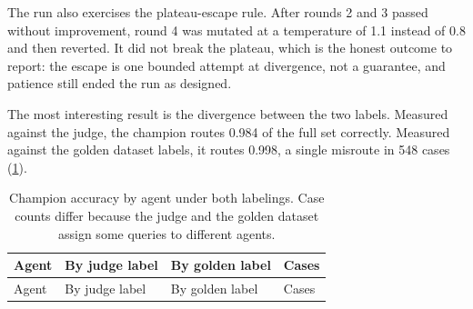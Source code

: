 The run also exercises the plateau-escape rule. After rounds 2 and 3 passed without improvement, round 4 was mutated at a temperature of 1.1 instead of 0.8 and then reverted. It did not break the plateau, which is the honest outcome to report: the escape is one bounded attempt at divergence, not a guarantee, and patience still ended the run as designed.

The most interesting result is the divergence between the two labels. Measured against the judge, the champion routes 0.984 of the full set correctly. Measured against the golden dataset labels, it routes 0.998, a single misroute in 548 cases (\cref{tbl:optimizer-champion}).

\begin{longtable}[]{@{}
  >{\raggedright\arraybackslash}p{}
  >{\raggedright\arraybackslash}p{}
  >{\raggedright\arraybackslash}p{}
  >{\raggedright\arraybackslash}p{}@{}}
\caption{Champion accuracy by agent under both labelings. Case counts differ because the judge and the golden dataset assign some queries to different agents.}\label{tbl:optimizer-champion}\tabularnewline
\toprule\noalign{}
\begin{minipage}[b]{\linewidth}\raggedright
Agent
\end{minipage} & \begin{minipage}[b]{\linewidth}\raggedright
By judge label
\end{minipage} & \begin{minipage}[b]{\linewidth}\raggedright
By golden label
\end{minipage} & \begin{minipage}[b]{\linewidth}\raggedright
Cases
\end{minipage} \\
\midrule\noalign{}
\endfirsthead
\toprule\noalign{}
\begin{minipage}[b]{\linewidth}\raggedright
Agent
\end{minipage} & \begin{minipage}[b]{\linewidth}\raggedright
By judge label
\end{minipage} & \begin{minipage}[b]{\linewidth}\raggedright
By golden label
\end{minipage} & \begin{minipage}[b]{\linewidth}\raggedright
Cases
\end{minipage} \\

\end{longtable}
